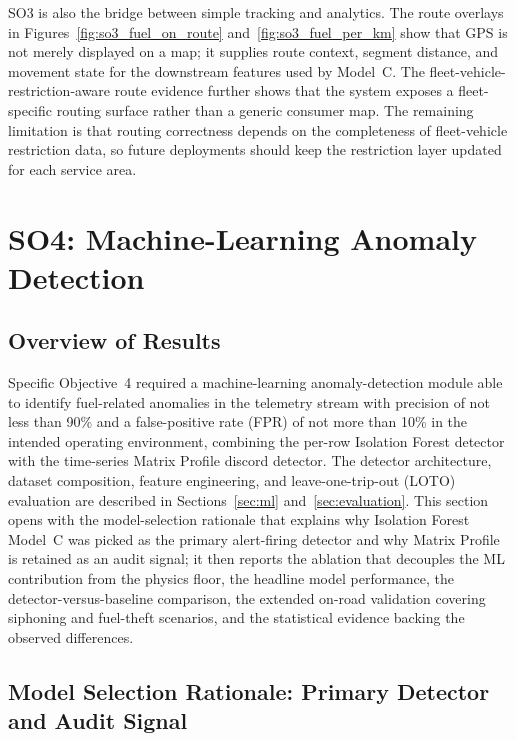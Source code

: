 SO3 is also the bridge between simple tracking and analytics. The route overlays in Figures~\ref{fig:so3_fuel_on_route} and~\ref{fig:so3_fuel_per_km} show that GPS is not merely displayed on a map; it supplies route context, segment distance, and movement state for the downstream features used by Model~C. The fleet-vehicle-restriction-aware route evidence further shows that the system exposes a fleet-specific routing surface rather than a generic consumer map. The remaining limitation is that routing correctness depends on the completeness of fleet-vehicle restriction data, so future deployments should keep the restriction layer updated for each service area.

\section{SO4: Machine-Learning Anomaly Detection}
\label{sec:results_so4}

\subsection{Overview of Results}
\label{sec:so4_overview}
Specific Objective~4 required a machine-learning anomaly-detection module able to identify fuel-related anomalies in the telemetry stream with precision of not less than 90\% and a false-positive rate (FPR) of not more than 10\% in the intended operating environment, combining the per-row Isolation Forest detector with the time-series Matrix Profile discord detector. The detector architecture, dataset composition, feature engineering, and leave-one-trip-out (LOTO) evaluation are described in Sections~\ref{sec:ml} and~\ref{sec:evaluation}. This section opens with the model-selection rationale that explains why Isolation Forest Model~C was picked as the primary alert-firing detector and why Matrix Profile is retained as an audit signal; it then reports the ablation that decouples the ML contribution from the physics floor, the headline model performance, the detector-versus-baseline comparison, the extended on-road validation covering siphoning and fuel-theft scenarios, and the statistical evidence backing the observed differences.

\subsection{Model Selection Rationale: Primary Detector and Audit Signal}
\label{sec:so4_model_selection}

